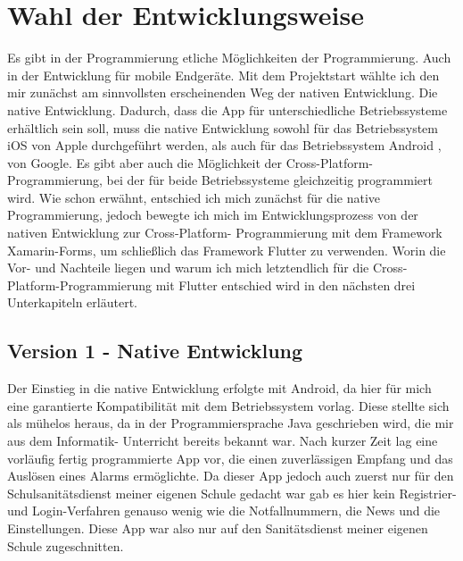 \section{Wahl der Entwicklungsweise}
    Es gibt in der Programmierung etliche Möglichkeiten der Programmierung. Auch in der 
    Entwicklung für mobile Endgeräte. Mit dem Projektstart wählte ich den mir zunächst am 
    sinnvollsten erscheinenden Weg der nativen Entwicklung.
    Die native Entwicklung. Dadurch, dass die App für unterschiedliche Betriebssysteme 
    erhältlich sein soll, muss die native Entwicklung sowohl für das Betriebssystem iOS 
    \cite{iOS} von Apple durchgeführt werden, als auch für das Betriebssystem Android 
    \cite{Android}, von Google.
    Es gibt aber auch die Möglichkeit der Cross-Platform-Programmierung, bei 
    der für beide Betriebssysteme gleichzeitig programmiert wird. 
    Wie schon erwähnt, entschied ich mich zunächst für die native Programmierung, jedoch 
    bewegte ich mich im Entwicklungsprozess von der nativen Entwicklung zur Cross-Platform-
    Programmierung mit dem Framework Xamarin-Forms, um schließlich das Framework Flutter zu 
    verwenden. Worin die Vor- und Nachteile liegen und warum ich mich letztendlich für die 
    Cross-Platform-Programmierung mit Flutter entschied wird in den nächsten drei 
    Unterkapiteln erläutert.

\subsection{Version 1 - Native Entwicklung}
    Der Einstieg in die native Entwicklung erfolgte mit Android, da hier für mich eine 
    garantierte Kompatibilität mit dem Betriebssystem vorlag. Diese stellte sich als mühelos
    heraus, da in der Programmiersprache Java geschrieben wird, die mir aus dem Informatik-
    Unterricht bereits bekannt war.
    Nach kurzer Zeit lag eine vorläufig fertig programmierte App vor, die einen zuverlässigen 
    Empfang und das Auslösen eines Alarms ermöglichte. Da dieser App jedoch auch zuerst nur 
    für den Schulsanitätsdienst meiner eigenen Schule gedacht war gab es hier kein Registrier-
    und Login-Verfahren genauso wenig wie die Notfallnummern, die News und die Einstellungen.
    Diese App war also nur auf den Sanitätsdienst meiner eigenen Schule zugeschnitten.

